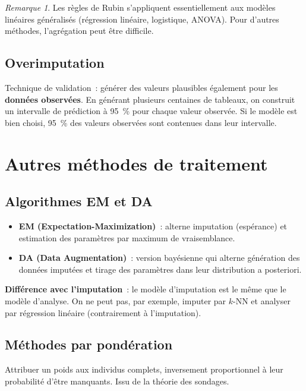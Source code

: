 \documentclass[a4paper,11pt]{article}
\theoremstyle{definition}
\theoremstyle{remark}
\newtheorem*{remark}{Remarque}
\begin{document}
\begin{remark}
  Les règles de Rubin s'appliquent essentiellement aux modèles linéaires
  généralisés (régression linéaire, logistique, ANOVA). Pour d'autres
  méthodes, l'agrégation peut être difficile.
\end{remark}

\subsection{Overimputation}

Technique de validation~: générer des valeurs plausibles également pour
les \textbf{données observées}. En générant plusieurs centaines de
tableaux, on construit un intervalle de prédiction à 95~\% pour chaque
valeur observée. Si le modèle est bien choisi, 95~\% des valeurs
observées sont contenues dans leur intervalle.

\section{Autres méthodes de traitement}

\subsection{Algorithmes EM et DA}

\begin{itemize}
  \item \textbf{EM (Expectation-Maximization)}~: alterne imputation
    (espérance) et estimation des paramètres par maximum de vraisemblance.
  \item \textbf{DA (Data Augmentation)}~: version bayésienne qui alterne
    génération des données imputées et tirage des paramètres dans leur
    distribution a posteriori.
\end{itemize}

\textbf{Différence avec l'imputation}~: le modèle d'imputation est le
même que le modèle d'analyse. On ne peut pas, par exemple, imputer par
$k$-NN et analyser par régression linéaire (contrairement à l'imputation).

\subsection{Méthodes par pondération}

Attribuer un poids aux individus complets, inversement proportionnel à
leur probabilité d'être manquants. Issu de la théorie des sondages.
\end{document}
